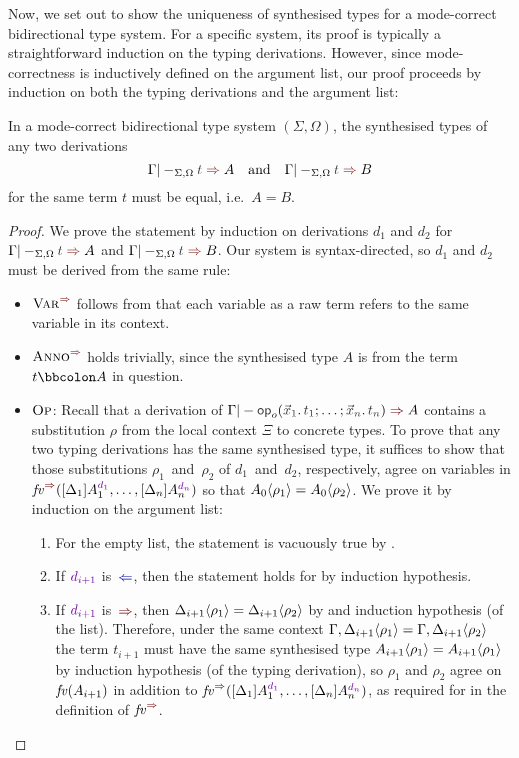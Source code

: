 Now, we set out to show the uniqueness of synthesised types for a mode-correct bidirectional type system.
For a specific system, its proof is typically a straightforward induction on the typing derivations.
However, since mode-correctness is inductively defined on the argument list, our proof proceeds by induction on both the typing derivations and the argument list:
\begin{lemma}\label{thm:unique-syn}
  In a mode-correct bidirectional type system $(\Sigma, \Omega)$, the synthesised types of any two derivations
  \[
    \Gamma |-_{\Sigma, \Omega} \isTerm{t} \syn A
    \quad\text{and}\quad
    \Gamma |-_{\Sigma, \Omega} \isTerm{t} \syn B
  \]
  for the same term $t$ must be equal, i.e.\ $A = B$.
\end{lemma}
\begin{proof}%
  We prove the statement by induction on derivations $d_1$ and $d_2$ for $\Gamma |-_{\Sigma, \Omega} \isTerm{t} \syn A$ and $\Gamma |-_{\Sigma, \Omega} \isTerm{t} \syn B$.
  Our system is syntax-directed, so $d_1$ and $d_2$ must be derived from the same rule: 
  \begin{itemize}
    \item $\SynRule{Var}$ follows from that each variable as a raw term refers to the same variable in its context.
    \item $\SynRule{Anno}$ holds trivially, since the synthesised type $A$ is from the term $t \annotate A$ in question.
    \item $\textnormal{\textsc{Op}}$: Recall that a derivation of\/ $\Gamma |- \tmOpts \syn A$ contains a substitution $\rho$ from the local context $\Xi$ to concrete types.
      To prove that any two typing derivations has the same synthesised type, it suffices to show that those substitutions $\rho_1$~and~$\rho_2$ of $d_1$~and~$d_2$, respectively, agree on variables in $\synvar(\biargs)$ so that ${A_0}\!\left<{\rho_1}\right> = {A_0}\!\left<{\rho_2}\right>$.
      We prove it by induction on the argument list:
      \begin{enumerate}
        \item For the empty list, the statement is vacuously true by .
        \item If $\dir{d_{i+1}}$ is~$\chk$, then the statement holds for  by induction hypothesis.
        \item If $\dir{d_{i+1}}$ is~$\syn$, then ${\Delta_{i+1}}\!\left<{\rho_1}\right> = {\Delta_{i+1}}\!\left<{\rho_2}\right>$ by  and induction hypothesis (of the list).
          Therefore, under the same context $\Gamma, {\Delta_{i+1}}\!\left<{\rho_1}\right> = \Gamma, {\Delta_{i+1}}\!\left<{\rho_2}\right>$ the term $t_{i+1}$ must have the same synthesised type ${A_{i+1}}\!\left<{\rho_1}\right> = {A_{i+1}}\!\left<{\rho_1}\right>$ by induction hypothesis (of the typing derivation), so $\rho_1$ and $\rho_2$ agree on $\mathit{fv}(A_{i+1})$ in addition to $\synvar(\biargs)$, as required for  in the definition of $\synvar$.
      \end{enumerate}
    \vspace{-\topsep-\baselineskip}
  \end{itemize}
\end{proof}

